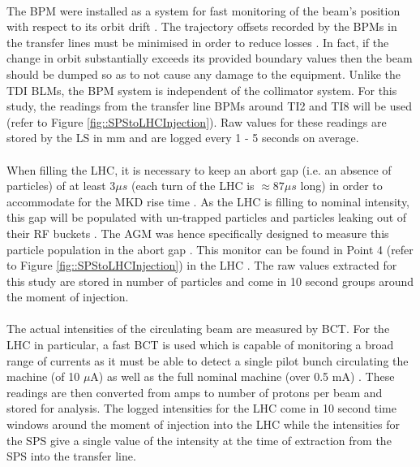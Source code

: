 \paragraph{ }The \ac{BPM} were installed as a system for fast monitoring of the beam's position with respect to its orbit drift \cite{Schmidt2006}. The trajectory offsets recorded by the \acs{BPM}s in the transfer lines must be minimised in order to reduce losses \cite{Drosdal2011}. In fact, if the change in orbit substantially exceeds its provided boundary values then the beam should be dumped \cite{Schmidt2006} so as to not cause any damage to the equipment. Unlike the \acs{TDI} \acs{BLM}s, the \acs{BPM} system is independent of the collimator system. For this study, the readings from the transfer line \acs{BPM}s around TI2 and TI8 will be used (refer to Figure \ref{fig::SPStoLHCInjection}). Raw values for these readings are stored by the \acs{LS} in mm and are logged every 1 - 5 seconds on average.

\paragraph{ }When filling the \acs{LHC}, it is necessary to keep an abort gap (i.e. an absence of particles) of at least 3$\mu s$ (each turn of the \acs{LHC} is $\approx87\mu s$ long) in order to accommodate for the \ac{MKD} rise time \cite{Meddahi2010}. As the \ac{LHC} is filling to nominal intensity, this gap will be populated with un-trapped particles and particles leaking out of their \ac{RF} buckets \cite{Meddahi2010}. The \ac{AGM} was hence specifically designed to measure this particle population in the abort gap \cite{Lefevre2010}. This monitor can be found in Point 4 (refer to Figure \ref{fig::SPStoLHCInjection}) in the LHC \cite{Lefevre2010}. The raw values extracted for this study are stored in number of particles and come in 10 second groups around the moment of injection.
 
\paragraph{ }The actual intensities of the circulating beam are measured by \ac{BCT}. For the \acs{LHC} in particular, a fast \acs{BCT} is used which is capable of monitoring a broad range of currents as it must be able to detect a single pilot bunch circulating the machine (of 10 $\mu$A) as well as the full nominal machine (over 0.5 mA) \cite{Jones2007}. These readings are then converted from amps to number of protons per beam and stored for analysis. The logged intensities for the \acs{LHC} come in 10 second time windows around the moment of injection into the \acs{LHC} while the intensities for the \acs{SPS} give a single value of the intensity at the time of extraction from the \acs{SPS} into the transfer line. 


